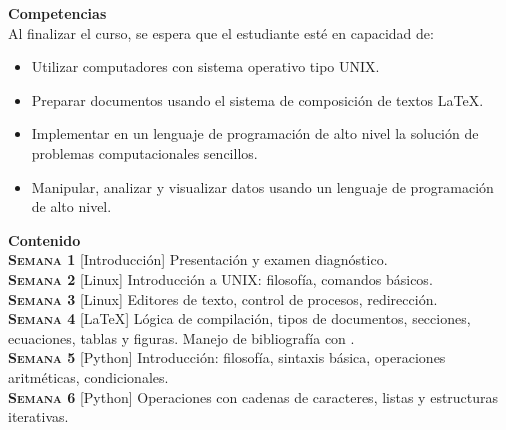 \documentclass[letterpaper,10pt,onecolumn]{article}
\begin{document}
\noindent\textbf{\large {} \quad Competencias}\\[-0.2cm]

\noindent\normalsize Al finalizar el curso, se espera que el estudiante esté en capacidad de:

\begin{itemize}
	\item Utilizar computadores con sistema operativo tipo UNIX.\\[-0.6cm]
	\item Preparar documentos usando el sistema de composición de textos \LaTeX.\\[-0.6cm]
	\item Implementar en un lenguaje de programación de alto nivel la solución de problemas computacionales sencillos.\\[-0.6cm]
	\item Manipular, analizar y visualizar datos usando un lenguaje de programación de alto nivel.\\[-0.2cm]
\end{itemize}

\noindent\textbf{\large {} \quad Contenido}\\[-0.2cm]

\noindent\normalsize \textbf{\textsc{Semana 1}} [Introducción]
Presentación y examen diagnóstico.
\\[-0.3cm] 

\noindent\textbf{\textsc{Semana 2}} [Linux]
Introducción a UNIX: filosofía, comandos básicos.
\\[-0.3cm] 

\noindent\textbf{\textsc{Semana 3}}  [Linux] Editores de texto,
control de procesos, redirección. \\[-0.3cm]  

\noindent\textbf{\textsc{Semana 4}} [\LaTeX] Lógica de
compilación, tipos de documentos, secciones, ecuaciones, tablas y
figuras. Manejo de bibliografía con \BibTeX.\\[-0.3cm]   

\noindent\textbf{\textsc{Semana 5}} [Python] Introducción: filosofía,
sintaxis básica, operaciones aritméticas, condicionales.\\[-0.3cm]   

\noindent\textbf{\textsc{Semana 6}} [Python] Operaciones con cadenas de
caracteres, listas y estructuras iterativas.\\[-0.3cm] 
\end{document}
